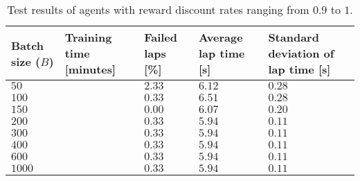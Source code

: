 \begin{table}[htb!]
\centering
\small
\begin{tabularx}{0.8\textwidth}{RLLL} 
    \hline
    \textbf{Batch size ($B$)} & Training time [minutes] & \textbf{Failed laps [\%]} & \textbf{Average lap time [s]} & \textbf{Standard deviation of lap time [s]}\\ 
    \hline
    $50$    & & $2.33$    & $6.12$  & $0.28$ \\      
    $100$   & & $0.33$    & $6.51$  & $0.28$ \\
    $150$   & & $0.00$    & $6.07$  & $0.20$ \\
    $200$   & & $0.33$    & $5.94$  & $0.11$ \\
    $300$   & & $0.33$    & $5.94$  & $0.11$ \\
    $400$   & & $0.33$    & $5.94$  & $0.11$ \\
    $600$   & & $0.33$    & $5.94$  & $0.11$ \\
    $1000$  & & $0.33$    & $5.94$  & $0.11$ \\
    \hline
\end{tabularx}
\caption[Test results of end-to-end agents with various reward discount rates]{Test results of agents with reward discount rates ranging from $0.9$ to $1$.}
\label{tab:gamma}
\end{table}
